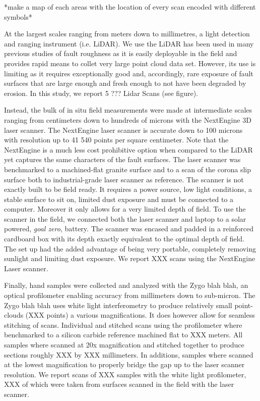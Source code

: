 \documentclass[12pt,a4paper]{article}
\begin{document}
*make a map of each areas with the location of every scan encoded with different symbols*

At the largest scales ranging from meters down to millimetres, a light detection and ranging instrument (i.e. LiDAR). We use the  LiDAR has been used in many previous studies of fault roughness as it is easily deployable in the field and provides rapid means to collet very large point cloud data set. However, its use is limiting as it requires exceptionally good and, accordingly, rare exposure of fault surfaces that are large enough and fresh enough to not have been degraded by erosion. In this study, we report 5 ??? Lidar Scans (see figure).

Instead, the bulk of in situ field measurements were made at intermediate scales ranging from centimeters down to hundreds of microns with the NextEngine 3D laser scanner. The NextEngine laser scanner is accurate down to 100 microns with resolution up to 41 540 points per square centimeter. Note that the NextEngine is a much less cost prohibitive option when compared to the LiDAR yet captures the same characters of the fault surfaces. The laser scanner was benchmarked to a machined-flat granite surface and to a scan of the corona slip surface both to industrial-grade laser scanner as reference. The scanner is not exactly built to be field ready. It requires a power source, low light conditions, a stable surface to sit on, limited dust exposure and must be connected to a computer. Moreover it only allows for a very limited depth of field. To use the scanner in the field, we connected both the laser scanner and laptop to a solar powered, \textit{goal zero}, battery. The scanner was encased and padded in a reinforced cardboard box with its depth exactly equivalent to the optimal depth of field. The set up had the added advantage of being very portable, completely removing sunlight and limiting dust exposure. We report XXX scans using the NextEngine Laser scanner.

Finally, hand samples were collected and analyzed with the Zygo blah blah, an optical profilometer enabling accuracy from millimeters down to sub-micron. The Zygo blah blah uses white light interferometry to produce relatively small point-clouds (XXX points) a various magnifications. It does however allow for seamless stitching of scans. Individual and stitched scans using the profilometer where benchmarked to a silicon carbide reference machined flat to XXX meters. All samples where scanned at 20x magnification and stitched together to produce sections roughly XXX by XXX millimeters. In additions, samples where scanned at the lowest magnification to properly bridge the gap up to the laser scanner resolution. We report scans of XXX samples with the white light profilometer, XXX of which were taken from surfaces scanned in the field with the laser scanner.
\end{document}
